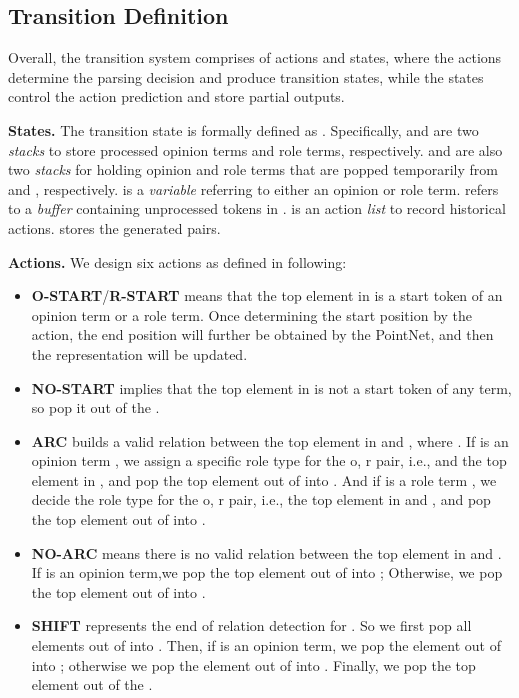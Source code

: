 \documentclass[letterpaper]{article} \usepackage{aaai22}  \usepackage{times}  \usepackage{helvet}  \usepackage{courier}  \usepackage[hyphens]{url}  \usepackage{graphicx} \urlstyle{rm} \def\UrlFont{\rm}  \usepackage{natbib}  \usepackage{caption} \DeclareCaptionStyle{ruled}{labelfont=normalfont,labelsep=colon,strut=off} \frenchspacing  \setlength{\pdfpagewidth}{8.5in}  \setlength{\pdfpageheight}{11in}  \usepackage{algorithm}
\begin{document}
\subsection{Transition Definition}

Overall, the transition system comprises of actions and states, where the actions determine the parsing decision and produce transition states, while the states control the action prediction and store partial outputs.




\noindent\textbf{States.}
The transition state is formally defined as  .
Specifically,  
 and  are two \emph{stacks} to store processed opinion terms and role terms, respectively.
 and  are also two \emph{stacks} for holding opinion and role terms that are popped temporarily from  and , respectively.
 is a \emph{variable} referring to either an opinion or role term.
 refers to a \emph{buffer} containing unprocessed tokens in .
 is an action \emph{list} to record historical actions.
 stores the generated pairs.




\noindent\textbf{Actions.}
We design six actions as defined in following:
\begin{itemize}
\setlength{\topsep}{0pt}
\setlength{\itemsep}{0pt}
\setlength{\parsep}{0pt}
\setlength{\parskip}{0pt}
    \item \textbf{O-START}/\textbf{R-START} means that the top element in  is a start token of an opinion term or a role term.
    Once determining the start position by the action, the end position will further be obtained by the PointNet,
    and then the  representation will be updated.

    \item \textbf{NO-START} implies that the top element in  is not a start token of any term, so pop it out of the .
      
    \item \textbf{ARC} builds a valid relation between the top element in  and , where .
    If  is an opinion term , we assign a specific role type  for the o, r pair, i.e.,  and the top element in , and pop the top element out of  into .
    And if  is a role term , we decide the role type  for the o, r pair, i.e., the top element in  and , and pop the top element out of  into .

    \item \textbf{NO-ARC} means there is no valid relation between the top element in  and .
    If  is an opinion term,we pop the top element out of  into ; Otherwise, we pop the top element out of  into .

    \item \textbf{SHIFT} represents the end of relation detection for .
    So we first pop all elements out of  into .
    Then, if  is an opinion term, we pop the element out of  into ; otherwise we pop the element out of  into .
    Finally, we pop the top element out of the .

\end{itemize}
\end{document}
